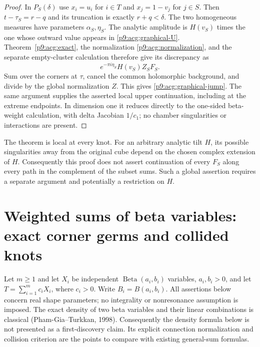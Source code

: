 \documentclass[11pt,a4paper]{article}
\theoremstyle{definition}
\theoremstyle{remark}
\numberwithin{equation}{section}
\begin{document}
\begin{proof}
In $P_S(\delta)$ use $x_i=u_i$ for $i\in T$ and $x_j=1-v_j$
for $j\in S$. Then $t-\tau_S=r-q$ and its truncation is exactly
$r+q<\delta$. The two homogeneous measures have parameters
$\alpha_S,\eta_S$. The analytic amplitude is $H(v_S)$ times
the one whose outward value appears in
\eqref{p9:acg:graphical-U}. Theorem~\ref{p9:acg:exact}, the normalization
\eqref{p9:acg:normalization}, and the separate empty-cluster calculation
therefore give its discrepancy as
\[
 e^{-\pi i\eta_S}H(v_S)Z_S F_S.
\]
Sum over the corners at $\tau$, cancel the common holomorphic
background, and divide by the global normalization $Z$. This gives
\eqref{p9:acg:graphical-jump}. The same argument supplies the asserted
local upper continuation, including at the extreme endpoints. In
dimension one it reduces directly to the one-sided beta-weight
calculation, with delta Jacobian $1/c_1$; no chamber singularities
or interactions are present.
\end{proof}

The theorem is local at every knot. For an arbitrary analytic tilt
$H$, its possible singularities away from the original cube depend
on the chosen complex extension of $H$. Consequently this proof
does not assert continuation of every $F_S$ along every path in the
complement of the subset sums. Such a global assertion requires a
separate argument and potentially a restriction on $H$.


\section{Weighted sums of beta variables: exact corner germs and collided knots}

Let $m\ge1$ and let $X_i$ be independent $\operatorname{Beta}(a_i,b_i)$ variables,
$a_i,b_i>0$, and let $T=\sum_{i=1}^m c_iX_i$, where $c_i>0$.
Write $B_i=B(a_i,b_i)$. All assertions below concern real shape
parameters; no integrality or nonresonance assumption is imposed.
The exact density of two beta variables and their linear combinations
is classical (Pham-Gia--Turkkan, 1998). Consequently the density formula
below is not presented as a first-discovery claim. Its explicit
connection normalization and collision criterion are the points to
compare with existing general-sum formulas.
\end{document}

